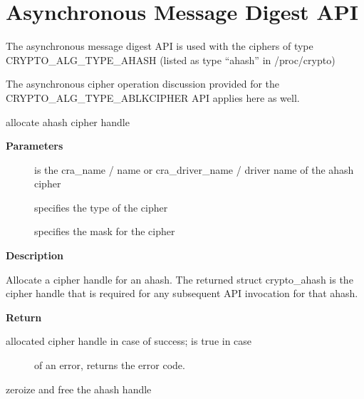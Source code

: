 \documentclass[a4paper,8pt,english]{sphinxmanual}
\begin{document}
\section{Asynchronous Message Digest API}
\label{crypto/api-digest:asynchronous-message-digest-api}
The asynchronous message digest API is used with the ciphers of type
CRYPTO\_ALG\_TYPE\_AHASH (listed as type ``ahash'' in /proc/crypto)

The asynchronous cipher operation discussion provided for the
CRYPTO\_ALG\_TYPE\_ABLKCIPHER API applies here as well.

\begin{fulllineitems}
\label{crypto/api-digest:c.crypto_alloc_ahash}
allocate ahash cipher handle

\end{fulllineitems}


\textbf{Parameters}
\begin{description}
\item[{}] \leavevmode
is the cra\_name / name or cra\_driver\_name / driver name of the
ahash cipher

\item[{}] \leavevmode
specifies the type of the cipher

\item[{}] \leavevmode
specifies the mask for the cipher

\end{description}

\textbf{Description}

Allocate a cipher handle for an ahash. The returned struct
crypto\_ahash is the cipher handle that is required for any subsequent
API invocation for that ahash.

\textbf{Return}
\begin{description}
\item[{allocated cipher handle in case of success;  is true in case}] \leavevmode
of an error,  returns the error code.

\end{description}

\begin{fulllineitems}
\label{crypto/api-digest:c.crypto_free_ahash}
zeroize and free the ahash handle

\end{fulllineitems}
\end{document}
